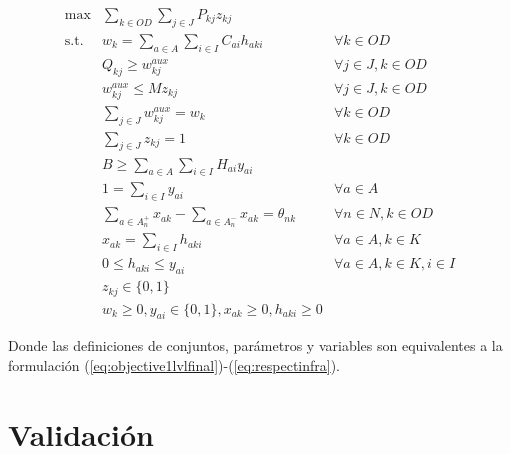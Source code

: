 \documentclass{article}
\begin{document}
  \begin{align}
    \text{max}    & \sum_{k \in OD} \sum_{j \in J} P_{kj} z_{kj}                          & \label{eq:objectivealtfinal} \\
    \text{s.t.}\; & w_k = \sum_{a \in A} \sum_{i \in I} C_{ai}h_{aki}                     & \forall k \in OD \label{eq:shortestpathaltfinal} \\
                  & Q_{kj} \geq w^{aux}_{kj}                                              & \forall j \in J, k \in OD \label{eq:breakpointsalt} \\
                  & w^{aux}_{kj} \leq M z_{kj}                                            & \forall j \in J, k \in OD \\
                  & \sum_{j \in J} w^{aux}_{kj} = w_k                                     & \forall k \in OD \\
                  & \sum_{j \in J} z_{kj} = 1                                             & \forall k \in OD \label{eq:singularbreakpointalt} \\
                  & B \geq \sum_{a \in A} \sum_{i \in I} H_{ai}y_{ai}                     & \label{eq:respectbudgetaltfinal} \\
                  & 1 = \sum_{i \in I} y_{ai}                                             & \forall a \in A \label{eq:alwaysoneyaltfinal} \\
                  & \sum_{a \in A_n^+} x_{ak} - \sum_{a \in A_n^-} x_{ak} = \theta_{nk}   & \forall n \in N, k \in OD \label{eq:flowbalancealtfinal} \\
                  & x_{ak} = \sum_{i \in I} h_{aki}                                       & \forall a \in A, k \in K \label{eq:flowactivationalt} \\
                  & 0 \leq h_{aki} \leq y_{ai}                                            & \forall a \in A, k \in K, i \in I \label{eq:respectinfraalt} \\
                  & z_{kj} \in \{0,1\}                                                    & \nonumber \\
                  & w_k \geq 0, y_{ai} \in \{0,1\}, x_{ak} \geq 0, h_{aki} \geq 0         & \nonumber
  \end{align}

  Donde las definiciones de conjuntos, parámetros y variables son equivalentes a la formulación (\ref{eq:objective1lvlfinal})-(\ref{eq:respectinfra}).

  \section*{Validación}
\end{document}
